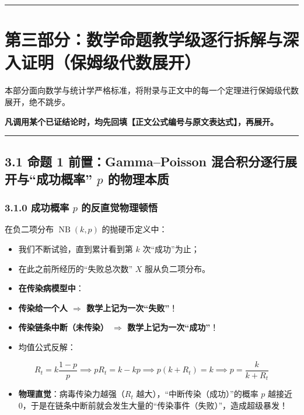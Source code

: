\documentclass[11pt,a4paper]{ctexart}
\begin{document}
\vspace{0.8em}\hrule\vspace{0.8em}

\section{第三部分：数学命题教学级逐行拆解与深入证明（保姆级代数展开）}

本部分面向数学与统计学严格标准，将附录与正文中的每一个定理进行保姆级代数展开，绝不跳步。

\textbf{凡调用某个已证结论时，均先回填【正文公式编号与原文表达式】，再展开。}


\vspace{0.8em}\hrule\vspace{0.8em}

\subsection{3.1 命题 1 前置：Gamma–Poisson 混合积分逐行展开与“成功概率” $p$ 的物理本质}

\subsubsection{3.1.0 成功概率 $p$ 的反直觉物理顿悟}
在负二项分布 $\operatorname{NB}(k, p)$ 的抛硬币定义中：

\begin{itemize}[leftmargin=2em, itemsep=2pt, parsep=0pt]
\item 我们不断试验，直到累计看到第 $k$ 次“成功”为止；
\item 在此之前所经历的“失败总次数” $X$ 服从负二项分布。
\item \textbf{在传染病模型中}：
\item \textbf{传染给一个人 $\Longrightarrow$ 数学上记为一次“失败”}！
\item \textbf{传染链条中断（未传染） $\Longrightarrow$ 数学上记为一次“成功”}！
\item 均值公式反解：
\end{itemize}
\[
R_t = k \frac{1-p}{p} \implies p R_t = k - kp \implies p(k + R_t) = k \implies p = \frac{k}{k + R_t}
\]
\begin{itemize}[leftmargin=2em, itemsep=2pt, parsep=0pt]
\item \textbf{物理直觉}：病毒传染力越强（$R_t$ 越大），“中断传染（成功）”的概率 $p$ 越接近 0，于是在链条中断前就会发生大量的“传染事件（失败）”，造成超级暴发！
\end{itemize}
\end{document}
